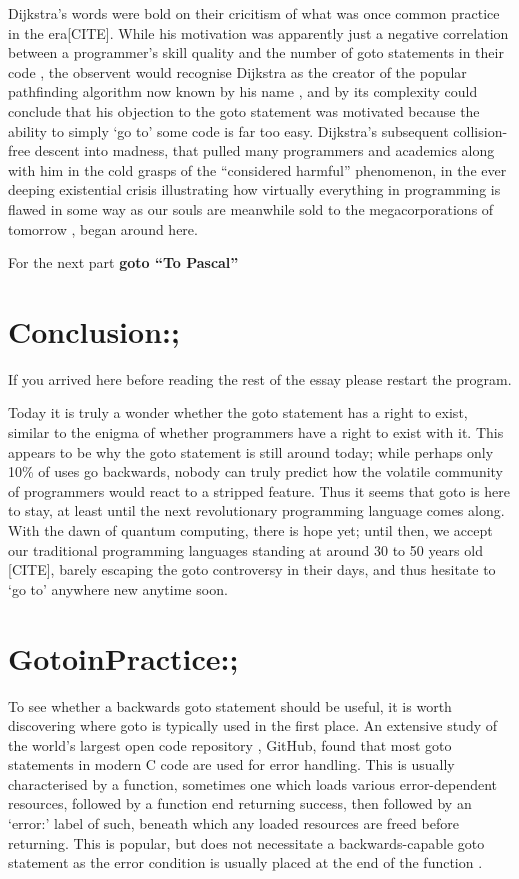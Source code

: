\documentclass{journal}
\begin{document}
Dijkstra's words were bold on their cricitism of what was once common practice in the era[CITE]. While his motivation was apparently just a negative correlation between a programmer's skill quality and the number of goto statements in their code \cite{goto, humanprogramming}, the observent would recognise Dijkstra as the creator of the popular pathfinding algorithm now known by his name \cite{pathfinding}, and by its complexity could conclude that his objection to the goto statement was motivated because the ability to simply `go to' some code is far too easy. Dijkstra's subsequent collision-free descent into madness, that pulled many programmers and academics along with him in the cold grasps of the ``considered harmful'' phenomenon, in the ever deeping existential crisis illustrating how virtually everything in programming is flawed in some way as our souls are meanwhile sold to the megacorporations of tomorrow \cite{truths}, began around here.

For the next part \textbf{goto ``To Pascal''}

\section{\textunderscore \textunderscore Conclusion:;}
If you arrived here before reading the rest of the essay please restart the program.

Today it is truly a wonder whether the goto statement has a right to exist, similar to the enigma of whether programmers have a right to exist with it. This appears to be why the goto statement is still around today; while perhaps only 10\% of uses \cite{github} go backwards, nobody can truly predict how the volatile community of programmers would react to a stripped feature. Thus it seems that goto is here to stay, at least until the next revolutionary programming language comes along. With the dawn of quantum computing, there is hope yet; until then, we accept our traditional programming languages standing at around 30 to 50 years old [CITE], barely escaping the goto controversy in their days, and thus hesitate to `go to' anywhere new anytime soon.

\section{\textunderscore \textunderscore Goto\textunderscore in\textunderscore Practice:;}
To see whether a backwards goto statement should be useful, it is worth discovering where goto is typically used in the first place. An extensive study \cite{gotostudy} of the world's largest open code repository \cite{github}, GitHub, found that most goto statements in modern C code are used for error handling. This is usually characterised by a function, sometimes one which loads various error-dependent resources, followed by a function end returning success, then followed by an `error:' label of such, beneath which any loaded resources are freed before returning. This is popular, but does not necessitate a backwards-capable goto statement as the error condition is usually placed at the end of the function \cite{gotostudy}.
\end{document}
